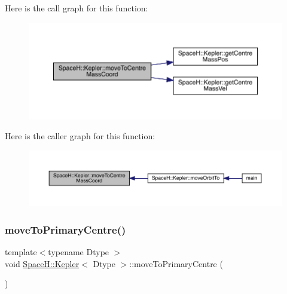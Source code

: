 Here is the call graph for this function\+:
\nopagebreak
\begin{figure}[H]
\begin{center}
\leavevmode
\includegraphics[width=350pt]{struct_space_h_1_1_kepler_a695ab24623b4bd6dbcba8fc388090ace_cgraph}
\end{center}
\end{figure}
Here is the caller graph for this function\+:
\nopagebreak
\begin{figure}[H]
\begin{center}
\leavevmode
\includegraphics[width=350pt]{struct_space_h_1_1_kepler_a695ab24623b4bd6dbcba8fc388090ace_icgraph}
\end{center}
\end{figure}
\mbox{\label{struct_space_h_1_1_kepler_a4f8da6a7c2ca873ebb19f885b7f2e889}} 
\subsubsection{\texorpdfstring{move\+To\+Primary\+Centre()}{moveToPrimaryCentre()}}
{\footnotesize\ttfamily template$<$typename Dtype $>$ \\
void \mbox{\hyperlink{struct_space_h_1_1_kepler}{Space\+H\+::\+Kepler}}$<$ Dtype $>$\+::move\+To\+Primary\+Centre (\begin{DoxyParamCaption}{ }\end{DoxyParamCaption})\hspace{0.3cm}{\ttfamily [inline]}}

